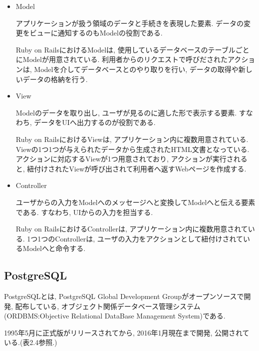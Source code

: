 \begin{itemize}
\item Model

アプリケーションが扱う領域のデータと手続きを表現した要素.
データの変更をビューに通知するのもModelの役割である.

Ruby on RailsにおけるModelは, 使用しているデータベースのテーブルごとにModelが用意されている.
利用者からのリクエストで呼びだされたアクションは, Modelを介してデータベースとのやり取りを行い, データの取得や新しいデータの格納を行う.

\item View

Modelのデータを取り出し, ユーザが見るのに適した形で表示する要素.
すなわち, データをUIへ出力するのが役割である.

Ruby on RailsにおけるViewは, アプリケーション内に複数用意されている.
Viewの1つ1つが与えられたデータから生成されたHTML文書となっている.
アクションに対応するViewが1つ用意されており, アクションが実行されると, 紐付けされたViewが呼び出されて利用者へ返すWebページを作成する.

\item Controller

ユーザからの入力をModelへのメッセージへと変換してModelへと伝える要素である.
すなわち, UIからの入力を担当する.

Ruby on RailsにおけるControllerは, アプリケーション内に複数用意されている.
1つ1つのControllerは, ユーザの入力をアクションとして紐付けされているModelへと命令する.

\end{itemize}

\subsection{PostgreSQL}
PostgreSQLとは, PostgreSQL Global Development Groupがオープンソースで開発, 配布している, オブジェクト関係データベース管理システム(ORDBMS:Objective Relational DataBase Management System)である.

1995年5月に正式版がリリースされてから, 2016年1月現在まで開発, 公開されている.(表2.4参照.)

